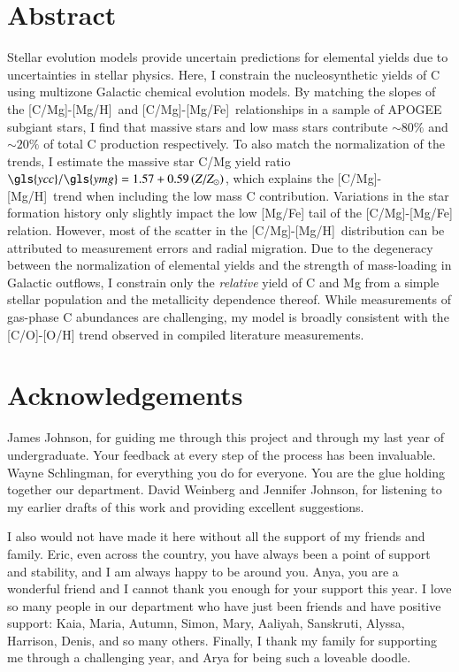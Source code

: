 \documentclass[12pt,oneside,letterpaper]{report}
\newcommand{\Ycc}{\gls{ycc}}
\newcommand{\Yoc}{\gls{ymg}}
\newcommand{\caah}{[C/Mg]-[Mg/H]}
\newcommand{\caafe}{[C/Mg]-[Mg/Fe]}
\newcommand{\about}[1]{${\sim} #1$}
\begin{document}
\chapter*{Abstract}
Stellar evolution models provide uncertain predictions for elemental yields due to uncertainties in stellar physics.
Here, I constrain the nucleosynthetic yields of C using multizone Galactic chemical evolution models.
By matching the slopes of the \caah\ and \caafe\ relationships in a sample of APOGEE subgiant stars, I find that massive stars and low mass stars contribute \about{80\%} and \about{20\%} of total C production respectively.
% 
To also match the normalization of the trends, I estimate the massive star C/Mg yield ratio $\Ycc/\Yoc = 1.57 + 0.59 \left(Z/Z_\odot\right)$, which explains the \caah\ trend when including the low mass C contribution.
%
Variations in the star formation history only slightly impact the low [Mg/Fe] tail of the [C/Mg]-[Mg/Fe] relation. However, most of the scatter in the \caah\ distribution can be attributed to measurement errors and radial migration. 
% 
Due to the degeneracy between the normalization of elemental yields and the strength of mass-loading in Galactic outflows, I constrain only the {\it relative} yield of C and Mg from a simple stellar population and the metallicity dependence thereof. While measurements of gas-phase C abundances are challenging, my model is broadly consistent with the [C/O]-[O/H] trend observed in compiled literature measurements.





\chapter*{Acknowledgements}

James Johnson, for guiding me through this project and through my last year of undergraduate. Your feedback at every step of the process has been invaluable.
Wayne Schlingman, for everything you do for everyone. You are the glue holding together our department. David Weinberg and Jennifer Johnson, for listening to my earlier drafts of this work and providing excellent suggestions.

I also would not have made it here without all the support of my friends and family. Eric, even across the country, you have always been a point of support and stability, and I am always happy to be around you. Anya, you are a wonderful friend and I cannot thank you enough for your support this year. 
I love so many people in our department who have just been friends and have positive support: Kaia, Maria, Autumn, Simon, Mary, Aaliyah, Sanskruti, Alyssa, Harrison, Denis, and so many others. 
Finally, I thank my family for supporting me through a challenging year, and Arya for being such a loveable doodle.
\end{document}
